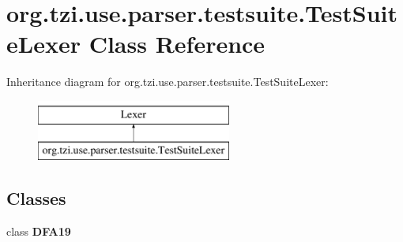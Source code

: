 \hypertarget{classorg_1_1tzi_1_1use_1_1parser_1_1testsuite_1_1_test_suite_lexer}{\section{org.\-tzi.\-use.\-parser.\-testsuite.\-Test\-Suite\-Lexer Class Reference}
\label{classorg_1_1tzi_1_1use_1_1parser_1_1testsuite_1_1_test_suite_lexer}
}
Inheritance diagram for org.\-tzi.\-use.\-parser.\-testsuite.\-Test\-Suite\-Lexer\-:\begin{figure}[H]
\begin{center}
\leavevmode
\includegraphics[height=2.000000cm]{classorg_1_1tzi_1_1use_1_1parser_1_1testsuite_1_1_test_suite_lexer}
\end{center}
\end{figure}
\subsection*{Classes}
\begin{DoxyCompactItemize}
\item 
class {\bfseries D\-F\-A19}
\end{DoxyCompactItemize}
